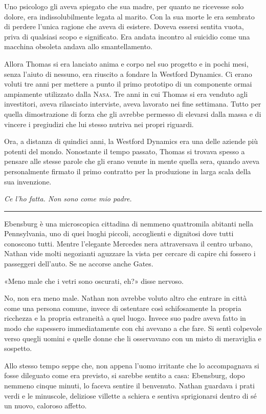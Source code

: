 Uno psicologo gli aveva spiegato che sua madre, per quanto ne ricevesse solo dolore, era
indissolubilmente legata al marito. Con la sua morte le era sembrato di perdere l'unica ragione che
aveva di esistere. Doveva essersi sentita vuota, priva di qualsiasi scopo e significato. Era andata
incontro al suicidio come una macchina obsoleta andava allo smantellamento.

Allora Thomas si era lanciato anima e corpo nel suo progetto e in pochi mesi, senza l'aiuto di
nessuno, era riuscito a fondare la Westford Dynamics. Ci erano voluti tre anni per mettere a punto
il primo prototipo di un componente ormai ampiamente utilizzato dalla {\scshape Nasa}. Tre anni in
cui Thomas si era venduto agli investitori, aveva rilasciato interviste, aveva lavorato nei fine
settimana. Tutto per quella dimostrazione di forza che gli avrebbe permesso di elevarsi dalla massa
e di vincere i pregiudizi che lui stesso nutriva nei propri riguardi.

Ora, a distanza di quindici anni, la Westford Dynamics era una delle aziende più potenti del mondo.
Nonostante il tempo passato, Thomas si trovava spesso a pensare alle stesse parole che gli erano
venute in mente quella sera, quando aveva personalmente firmato il primo contratto per la produzione
in larga scala della sua invenzione.

\emph{Ce l'ho fatta. Non sono come mio padre.}

\plainbreak{1}

Ebensburg è una microscopica cittadina di nemmeno quattromila abitanti nella Pennsylvania, uno di
quei luoghi piccoli, accoglienti e dignitosi dove tutti conoscono tutti. Mentre l'elegante Mercedes
nera attraversava il centro urbano, Nathan vide molti negozianti aguzzare la vista per cercare di
capire chi fossero i passeggeri dell'auto. Se ne accorse anche Gates.

«Meno male che i vetri sono oscurati, eh?» disse nervoso.

No, non era meno male. Nathan non avrebbe voluto altro che entrare in città come una persona comune,
invece di ostentare così schifosamente la propria ricchezza e la propria estraneità a quel luogo.
Invece suo padre aveva fatto in modo che sapessero immediatamente con chi avevano a che fare. Si
sentì colpevole verso quegli uomini e quelle donne che li osservavano con un misto di meraviglia e
sospetto.

Allo stesso tempo seppe che, non appena l'uomo irritante che lo accompagnava si fosse dileguato come
era previsto, si sarebbe sentito a casa: Ebensburg, dopo nemmeno cinque minuti, lo faceva sentire il
benvenuto. Nathan guardava i prati verdi e le minuscole, deliziose villette a schiera e sentiva
sprigionarsi dentro di sé un nuovo, caloroso affetto.


